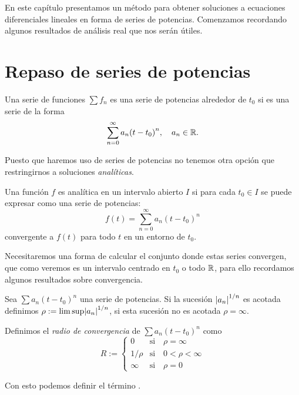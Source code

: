 \documentclass[../ecuaciones_diferenciales.tex]{subfiles}
\begin{document}
En este capítulo presentamos un método para obtener soluciones a ecuaciones
diferenciales lineales en forma de series de potencias. Comenzamos recordando
algunos resultados de análisis real que nos serán útiles.

\section{Repaso de series de potencias}

\begin{definition}
	Una serie de funciones \(\sum f_n\) es una serie de potencias alrededor de
	\(t_0\) si es una serie de la forma
	\[\sum_{n = 0}^\infty a_n {(t - t_0)}^n, \quad a_n \in \mathbb{R}.\]
\end{definition}

Puesto que haremos uso de series de potencias no tenemos otra opción 
que restringirnos a soluciones \emph{analíticas}.

\begin{definition}
	Una función \(f\) es analítica en un intervalo abierto \(I\) si para cada
	\(t_0 \in I\) se puede expresar como una serie de potencias:
	\[f(t) = \sum_{n = 0}^\infty a_n {(t - t_0)}^n\]
	convergente a \(f(t)\) para todo \(t\) en un entorno de \(t_0\).
\end{definition}

Necesitaremos una forma de calcular el conjunto donde estas series convergen,
que como veremos es un intervalo centrado en \(t_0\) o todo \(\mathbb{R}\), para ello 
recordamos algunos resultados sobre convergencia.

\begin{definition}
	Sea \(\sum a_n {(t - t_0)}^n\) una serie de potencias. Si la sucesión 
	\(\abs{a_n}^{1/n}\) es acotada definimos 
	\(\rho := \lim\sup\abs{a_n}^{1/n}\), si esta sucesión no es acotada 
	\(\rho = \infty\). 

	Definimos el \emph{radio de convergencia} de \(\sum a_n {(t - t_0)}^n\) como
	\[R := 
		\begin{cases}
			0 & \text{si} \quad \rho = \infty \\
			1/\rho & \text{si} \quad 0 < \rho < \infty \\
			\infty & \text{si} \quad \rho = 0
		\end{cases}
	\]
\end{definition}

Con esto podemos definir el término .
\end{document}
